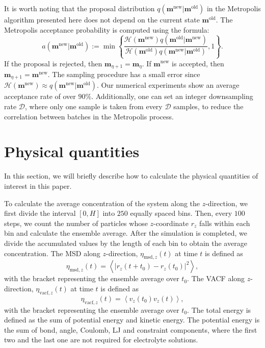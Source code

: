It is worth noting that the proposal distribution $q(\bm{m}^{\text{new}}|\bm{m}^{\text{old}})$ in the Metropolis algorithm presented here does not depend on the current state $\bm{m}^{\text{old}}$. The Metropolis acceptance probability is computed using the formula:
\begin{equation}
	a(\bm{m}^{\text{new}}|\bm{m}^{\text{old}}):=\min\left\{\frac{\mathcal{H}(\bm{m}^{\text{new}})q(\bm{m}^{\text{old}}|\bm{m}^{\text{new}})}{\mathcal{H}(\bm{m}^{\text{old}})q(\bm{m}^{\text{new}}|\bm{m}^{\text{old}})},1\right\}.
\end{equation}
If the proposal is rejected, then $\bm{m}_{\eta+1}=\bm{m}_{\eta}$. If $\bm{m}^{\text{new}}$ is accepted, then $\bm{m}_{\eta+1}=\bm{m}^{\text{new}}$. The sampling procedure has a small error since $\mathcal{H}(\bm{m}^{\text{new}})\approx q(\bm{m}^{\text{new}}|\bm{m}^{\text{old}})$. Our numerical experiments show an average acceptance rate of over $90\%$. Additionally, one can set an integer downsampling rate $\mathscr{D}$, where only one sample is taken from every $\mathscr{D}$ samples, to reduce the correlation between batches in the Metropolis process.

\section{Physical quantities}\label{Sec::phyquan}

In this section, we will briefly describe how to calculate the physical quantities of interest in this paper.

To calculate the average concentration of the system along the $z$-direction, we first divide the interval $[0,H]$ into $250$ equally spaced bins. Then, every $100$ steps, we count the number of particles whose $z$-coordinate $r_z$ falls within each bin and calculate the ensemble average. After the simulation is completed, we divide the accumulated values by the length of each bin to obtain the average concentration. The MSD along $z$-direction, $\eta_{\text{msd},z}(t)$ at time $t$ is defined as
\begin{equation}
\eta_{\mathrm{msd},z}(t)=\left\langle\left|r_z\left(t+t_0\right)-r_z\left(t_0\right)\right|^2\right\rangle,
\end{equation}
with the bracket representing the ensemble average over $t_0$. The VACF along $z$-direction, $\eta_{\text{vacf},z}(t)$ at time $t$ is defined as
\begin{equation}
\eta_{\text {vacf},z}(t)=\left\langle v_z\left(t_0\right) v_z(t)\right\rangle,
\end{equation}
with the bracket representing the ensemble average over $t_0$. The total energy is defined as the sum of potential energy and kinetic energy. The potential energy is the sum of bond, angle, Coulomb, LJ and  {constraint} components, where the first two and the last one are not required for electrolyte solutions. 

